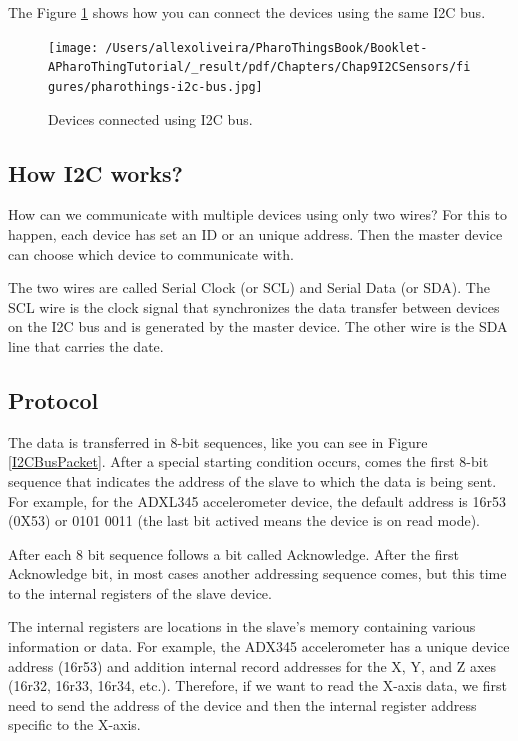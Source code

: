 \documentclass[10pt,twoside,english]{_support/latex/sbabook/sbabook}
\begin{document}
The Figure \ref{I2CBus} shows how you can connect the devices using the same I2C bus.


\begin{figure}

\begin{center}
\texttt{[image: /Users/allexoliveira/PharoThingsBook/Booklet-APharoThingTutorial/\_result/pdf/Chapters/Chap9I2CSensors/figures/pharothings-i2c-bus.jpg]}\caption{Devices connected using I2C bus.\label{I2CBus}}\end{center}
\end{figure}

\subsection{How I2C works?}
How can we communicate with multiple devices using only two wires? For this to happen, each device has set an ID or an unique address. Then the master device can choose which device to communicate with.

The two wires are called Serial Clock (or SCL) and Serial Data (or SDA). The SCL wire is the clock signal that synchronizes the data transfer between devices on the I2C bus and is generated by the master device. The other wire is the SDA line that carries the date.
\subsection{Protocol}
The data is transferred in 8-bit sequences, like you can see in Figure \ref{I2CBusPacket}. After a special starting condition occurs, comes the first 8-bit sequence that indicates the address of the slave to which the data is being sent.
For example, for the ADXL345 accelerometer device, the default address is 16r53 (0X53) or 0101 0011 (the last bit actived means the device is on read mode).

After each 8 bit sequence follows a bit called Acknowledge. After the first Acknowledge bit, in most cases another addressing sequence comes, but this time to the internal registers of the slave device. 

The internal registers are locations in the slave's memory containing various information or data. For example, the ADX345 accelerometer has a unique device address (16r53) and addition internal record addresses for the X, Y, and Z axes (16r32, 16r33, 16r34, etc.). Therefore, if we want to read the X-axis data, we first need to send the address of the device and then the internal register address specific to the X-axis.
\end{document}
